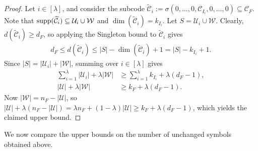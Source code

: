 \documentclass[conference, 10pt]{IEEEtran}
\theoremstyle{plain}
\theoremstyle{definition}
\newcommand{\supp}{\textup{supp}}
\newcommand{\mC}{\mathcal{C}}
\newcommand{\mU}{\mathcal{U}}
\newcommand{\mW}{\mathcal{W}}
\begin{document}
\begin{proof}
Let $i\in [\lambda]$, and consider the subcode $\widetilde{\mC}_i:=\sigma(0,\dots,0,\mC_{I_i},0,\dots,0)\subseteq \mC_F$. Note that $\supp(\widetilde{\mC}_i)\subseteq \mU_i\cup \mW$ and $\dim(\widetilde{\mC}_i)=k_{I_i}$. Let $S=\mU_i\cup \mW$. Clearly, $d(\widetilde{\mC}_i)\ge d_F$, so applying the Singleton bound to $\widetilde{\mC}_i$ gives
\begin{align*} d_F\le d(\widetilde{\mC}_i)\le |S|-\dim(\widetilde{\mC}_i)+1=|S|-k_{I_i}+1. \end{align*}
Since $|S|=|\mU_i|+|\mW|$, summing over $i\in [\lambda]$ gives
\begin{align*}
\sum_{i=1}^{\lambda}|\mU_i|+\lambda|\mW|&\ge \sum_{i=1}^{\lambda}k_{I_i}+\lambda(d_F-1), \\
|\mU|+\lambda|\mW|&\ge k_F+\lambda(d_F-1).
\end{align*}
Now $|\mW|=n_F-|\mU|$, so $|\mU|+\lambda(n_F-|\mU|)=\lambda n_F+(1-\lambda)|\mU|\ge k_F+\lambda(d_F-1)$, which yields the claimed upper bound.
\end{proof}

We now compare the upper bounds on the number of unchanged symbols obtained above.
\end{document}
